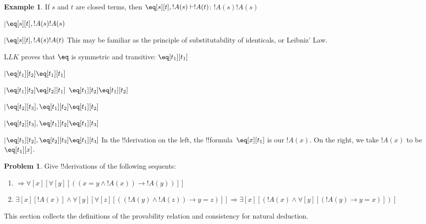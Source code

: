 \documentclass[10pt,a4paper]{article}
\theoremstyle{plain}
\theoremstyle{definition}
\newtheorem{ex}[thm]{Example}
\newtheorem{prob}{Problem}[section]
\theoremstyle{remark}
\newenvironment{editorial}{}{}
\providecommand{\RightLabel}[1]{}
\providecommand{\DisplayProof}{}
\providecommand{\fCenter}{}
\newenvironment{prooftree}{}{}
\providecommand{\lif}{\mathbin{\rightarrow}}
\providecommand{\lforall}{\mathord{\forall}}
\providecommand{\lexists}{\mathord{\exists}}
\providecommand{\Sequent}{\mathrel{\Rightarrow}}
\providecommand{\Proves}{\mathrel{\vdash}}
\providecommand{\Log}{\ensuremath{\mathrm{L}}}
\providecommand{\LeftR}[1]{}
\providecommand{\UnaryInf}{\ensuremath{\mid}}
\providecommand{\Weakening}{\mathrm{Wk}}
\providecommand{\LeftR}{\mathrm{L}}
\providecommand{\Axiom}{\mathrm{Ax}}
\begin{document}
\begin{ex}
If $s$ and $t$ are closed terms, then $\eq[s][t], !A(s)
\Proves !A(t)$:
\begin{prooftree}
\Axiom$ !A(s) \fCenter !A(s)$
\RightLabel{\LeftR{\Weakening}}
\UnaryInf$\eq[s][t], !A(s)  \fCenter !A(s)$
\RightLabel{$\eq$}
\UnaryInf$\eq[s][t], !A(s)  \fCenter !A(t)$
\end{prooftree}
This may be familiar as the principle of substitutability of
identicals, or Leibniz' Law.

$\Log{LK}$ proves that $\eq$ is symmetric and transitive:
\begin{prooftree}
\Axiom$ \fCenter \eq[t_1][t_1] $
\RightLabel{\LeftR{\Weakening}}
\UnaryInf$ \eq[t_1][t_2] \fCenter \eq[t_1][t_1] $
\RightLabel{$\eq$}
\UnaryInf$ \eq[t_1][t_2] \fCenter \eq[t_2][t_1]$
\DisplayProof\qquad\bottomAlignProof
\Axiom$ \eq[t_1][t_2] \fCenter \eq[t_1][t_2] $
\RightLabel{\LeftR{\Weakening}}
\UnaryInf$\eq[t_2][t_3], \eq[t_1][t_2]  \fCenter \eq[t_1][t_2] $
\RightLabel{$\eq$}
\UnaryInf$\eq[t_2][t_3], \eq[t_1][t_2]  \fCenter \eq[t_1][t_3]$
\RightLabel{\LeftR{\Exchange}}
\UnaryInf$\eq[t_1][t_2], \eq[t_2][t_3]  \fCenter \eq[t_1][t_3]$
\end{prooftree}
In the !!{derivation} on the left, the !!{formula}~$\eq[x][t_1]$ is our
$!A(x)$. On the right, we take $!A(x)$ to be~$\eq[t_1][x]$.
\end{ex}

\begin{prob}
Give !!{derivation}s of the following sequents:
\begin{enumerate}
\item $\Sequent \lforall[x][\lforall[y][((x = y \land !A(x)) \lif !A(y))]]$
\item $\lexists[x][!A(x)] \land \lforall[y][\lforall[z][((!A(y) \land
    !A(z)) \lif y = z)]] \Sequent 
\lexists[x][(!A(x) \land \lforall[y][(!A(y) \lif y = x)])]$
\end{enumerate}
\end{prob}





\begin{editorial}
  This section collects the definitions of the provability relation and
  consistency for natural deduction.
\end{editorial}
\end{document}
